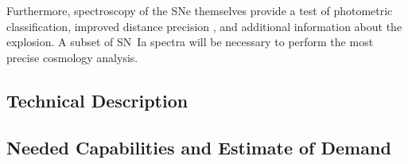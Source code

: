 Furthermore, spectroscopy of the SNe themselves provide a test of
photometric classification, improved distance precision
\citep{Bailey09, Blondin11, Foley11:vel}, and additional information
about the explosion.  A subset of SN~Ia spectra will be necessary to
perform the most precise cosmology analysis.

\subsection{Technical Description}

\subsection{Needed Capabilities and Estimate of Demand}
